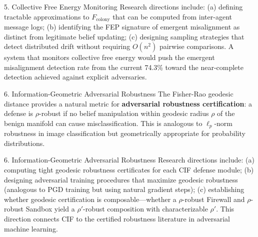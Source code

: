 \documentclass[
  ignorenonframetext,
]{beamer}
\begin{document}
\begin{frame}[allowframebreaks]{5. Collective Free Energy Monitoring}
Research directions include: (a) defining tractable approximations to
\(F_\text{colony}\) that can be computed from inter-agent message logs;
(b) identifying the FEP signature of emergent misalignment as distinct
from legitimate belief updating; (c) designing sampling strategies that
detect distributed drift without requiring \(O(n^2)\) pairwise
comparisons. A system that monitors collective free energy would push
the emergent misalignment detection rate from the current 74.3\% toward
the near-complete detection achieved against explicit adversaries.
\end{frame}

\begin{frame}[allowframebreaks]{6. Information-Geometric Adversarial
Robustness}
\protect{}\label{information-geometric-adversarial-robustness}
The Fisher-Rao geodesic distance \cite{amari2000methods} provides a
natural metric for \textbf{adversarial robustness certification}: a
defense is \(\rho\)-robust if no belief manipulation within geodesic
radius \(\rho\) of the benign manifold can cause misclassification. This
is analogous to \(\ell_p\)-norm robustness in image classification but
geometrically appropriate for probability distributions.

\end{frame}

\begin{frame}[allowframebreaks]{6. Information-Geometric Adversarial
Robustness}
Research directions include: (a) computing tight geodesic robustness
certificates for each CIF defense module; (b) designing adversarial
training procedures that maximize geodesic robustness (analogous to PGD
training but using natural gradient steps); (c) establishing whether
geodesic certification is composable---whether a \(\rho\)-robust
Firewall and \(\rho\)-robust Sandbox yield a \(\rho'\)-robust
composition with characterizable \(\rho'\). This direction connects CIF
to the certified robustness literature in adversarial machine learning.
\end{frame}
\end{document}
